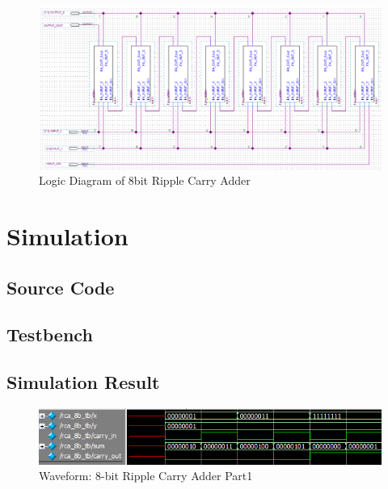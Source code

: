 \documentclass{report}
\begin{document}
        \begin{figure}[!htb]
            \centering
            \includegraphics[width=\textwidth]{diagrams/rca-8b-logic.PNG}
            \caption{Logic Diagram of 8bit Ripple Carry Adder}
        \end{figure}

    \chapter{Simulation}
        \section{Source Code}
            
            
        \section{Testbench}
            

        \section{Simulation Result}
            \begin{figure}[!htb]
                \centering
                \includegraphics[width=\textwidth]{diagrams/rca-8b-waveform-part1.PNG}
        
                \caption{Waveform: 8-bit Ripple Carry Adder Part1}
                \label{fig:waveform_rca8bp1}
            \end{figure}
\end{document}
